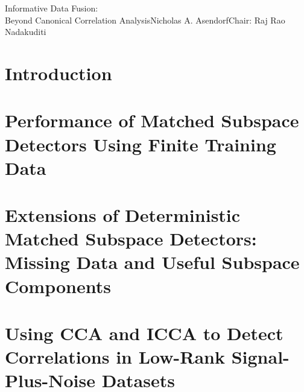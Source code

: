 \documentclass[reqno,12pt,oneside]{report} %
\begin{document}
\startabstractpage
{Informative Data Fusion:\\ Beyond Canonical Correlation Analysis}{Nicholas
  A. Asendorf}{Chair: Raj Rao Nadakuditi}

\label{Abstract}

\startthechapters 


\chapter{Introduction}\label{sec:intro}



\chapter{Performance of Matched Subspace Detectors Using Finite Training Data}\label{sec:chpt_msd}


\chapter{Extensions of Deterministic Matched Subspace Detectors: Missing Data and Useful
  Subspace Components}\label{sec:chpt_msd_exten}


%


\chapter{Using CCA and ICCA to Detect Correlations in Low-Rank Signal-Plus-Noise Datasets}\label{sec:chpt_cca_det}
%

\end{document}

